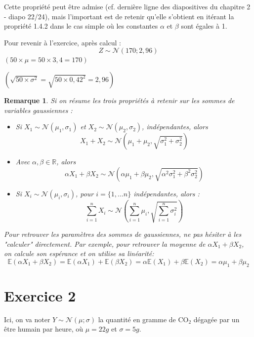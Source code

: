 \documentclass[a4paper,oneside,12pt]{article}
\theoremstyle{plain}
\newtheorem*{remark}{Remarque}
\def\R{{\mathbb R}}
\def\E{{\mathbb E}}
\begin{document}
\begin{enumerate}
    Cette propriété peut être admise (cf. dernière ligne des diapositives du chapitre 2 - diapo 22/24), mais l'important est de retenir qu'elle s'obtient en itérant la propriété 1.4.2 dans le cas simple où les constantes $\alpha$ et $\beta$ sont égales à 1.
    
    Pour revenir à l'exercice, après calcul :
      $$Z \sim\mathcal{N}(170; 2,96)$$
    $(50 \times \mu = 50 \times 3,4 = 170)$
    
    \noindent $(\sqrt{50\times\sigma^2}= \sqrt{50\times0,42^2} = 2,96)$

        \begin{remark}
    
    Si on résume les trois propriétés à retenir sur les sommes de variables gaussiennes :
    
\begin{itemize}
\item Si $X_1\sim \mathcal{N}(\mu_1,\sigma_1)$ et $X_2\sim\mathcal{N}(\mu_2,\sigma_2)$, indépendantes, alors
 $$X_1 + X_2\sim \mathcal{N}\left(\mu_1+\mu_2,\sqrt{\sigma_1^2+\sigma_2^2}\right)$$

\item Avec $\alpha, \beta \in \R$, alors
 $$\alpha X_1 + \beta X_2\sim \mathcal{N}\left(\alpha\mu_1+\beta\mu_2,\sqrt{\alpha^2\sigma_1^2+\beta^2\sigma_2^2}\right)$$

\item Si $X_i\sim \mathcal{N}(\mu_i,\sigma_i)$, pour $i=\{1, ...n\}$ indépendantes, alors :
 $$\sum_{i=1}^n X_i \sim \mathcal{N}\left(\sum_{i=1}^n \mu_i,\sqrt{\sum_{i=1}^n \sigma_i^2}\right)$$
\end{itemize}

Pour retrouver les paramètres des sommes de gaussiennes, ne pas hésiter à les "calculer" directement. Par exemple, pour retrouver la moyenne de  $\alpha X_1 + \beta X_2$, on calcule son espérance et on utilise sa linéarité:
$$\E(\alpha X_1 + \beta X_2) = \E(\alpha X_1)+\E(\beta X_2) = \alpha \E(X_1) + \beta \E(X_2) = \alpha\mu_1+\beta\mu_2$$
        \end{remark}
\end{enumerate}


\section*{Exercice 2}

Ici, on va noter $Y  \sim\mathcal{N}(\mu; \sigma)$  la quantité en gramme de $\mbox{CO}_2$ dégagée par un être humain par heure, où $\mu = 22g$ et $\sigma = 5g$.
\end{document}
